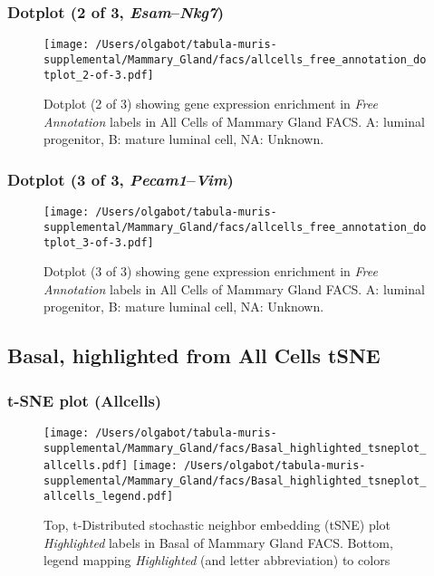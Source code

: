 \clearpage

\subsubsection{Dotplot (2 of 3, \emph{Esam}--\emph{Nkg7})}
\begin{figure}[h]
\centering
\texttt{[image: /Users/olgabot/tabula-muris-supplemental/Mammary\_Gland/facs/allcells\_free\_annotation\_dotplot\_2-of-3.pdf]}

\caption{ Dotplot (2 of 3)  showing gene expression enrichment in \emph{Free Annotation} labels in All Cells of Mammary Gland FACS. A: luminal progenitor, B: mature luminal cell, NA: Unknown.}
\end{figure}


\clearpage

\subsubsection{Dotplot (3 of 3, \emph{Pecam1}--\emph{Vim})}
\begin{figure}[h]
\centering
\texttt{[image: /Users/olgabot/tabula-muris-supplemental/Mammary\_Gland/facs/allcells\_free\_annotation\_dotplot\_3-of-3.pdf]}

\caption{ Dotplot (3 of 3)  showing gene expression enrichment in \emph{Free Annotation} labels in All Cells of Mammary Gland FACS. A: luminal progenitor, B: mature luminal cell, NA: Unknown.}
\end{figure}


\clearpage

\subsection{Basal, highlighted from All Cells tSNE}

\subsubsection{t-SNE plot (Allcells)}
\begin{figure}[h]
\centering
\texttt{[image: /Users/olgabot/tabula-muris-supplemental/Mammary\_Gland/facs/Basal\_highlighted\_tsneplot\_allcells.pdf]}
\texttt{[image: /Users/olgabot/tabula-muris-supplemental/Mammary\_Gland/facs/Basal\_highlighted\_tsneplot\_allcells\_legend.pdf]}
\caption{Top, t-Distributed stochastic neighbor embedding (tSNE) plot  \emph{Highlighted} labels in Basal of Mammary Gland FACS. Bottom, legend mapping \emph{Highlighted} (and letter abbreviation) to colors}
\end{figure}


